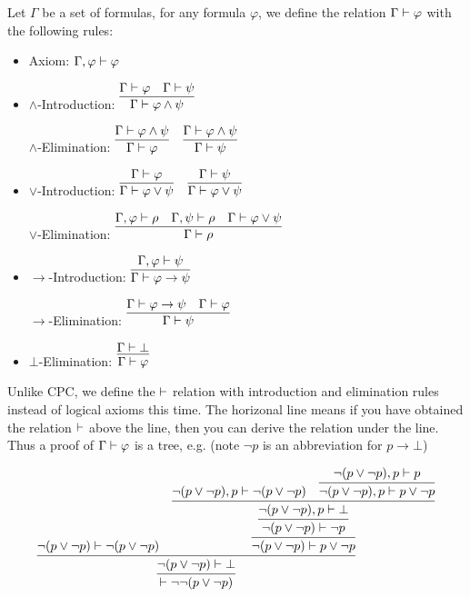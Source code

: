 \begin{definition}
    Let $\Gamma$ be a set of formulas, for any formula $\varphi$, we define
    the relation $\Gamma\vdash\varphi$ with the following rules:
    \begin{itemize}
        \item Axiom: $\Gamma,\varphi\vdash\varphi$
        \item $\wedge$-Introduction: $\infer{\Gamma\proves\varphi\wedge\psi}
            {\Gamma\proves\varphi & \Gamma\proves \psi}$

            $\wedge$-Elimination:
            $\infer{\Gamma\proves\varphi}{\Gamma\proves\varphi\wedge\psi}$\ \  
            $\infer{\Gamma\proves\psi}{\Gamma\proves\varphi\wedge\psi}$
        \item $\vee$-Introduction: 
            $\infer{\Gamma\proves\varphi\vee\psi}{\Gamma\proves\varphi}$\ \  
            $\infer{\Gamma\proves\varphi\vee\psi}{\Gamma\proves\psi}$

            $\vee$-Elimination:
            $\infer{\Gamma\proves\rho}
            {\Gamma,\varphi\proves\rho & \Gamma,\psi\proves\rho & \Gamma\proves\varphi\vee\psi}$

        \item $\to$-Introduction: 
            $\infer{\Gamma\proves\varphi\to\psi}{\Gamma,\varphi\proves\psi}$

            $\to$-Elimination:
            $\infer{\Gamma\proves\psi}{\Gamma\proves\varphi\to\psi & \Gamma\proves\varphi}$
        \item $\bot$-Elimination:
            $\infer{\Gamma\proves\varphi}{\Gamma\proves\bot}$
    \end{itemize}
\end{definition}

Unlike CPC, we define the $\vdash$
relation with introduction and elimination rules instead of logical axioms
this time. The horizonal line means if you have obtained the relation 
$\vdash$ above the line, then you can derive the relation under the line. 
Thus a proof of $\Gamma\vdash\varphi$ is a tree, e.g. (note $\neg p$ is an
abbreviation for $p\to\bot$)

\begin{equation}
    \label{nnLEM}
    $$
    \infer{\proves\neg\neg(p\vee\neg p)}{
        \infer{\neg(p\vee\neg p)\proves\bot}{
            \neg(p\vee\neg p)\proves \neg(p\vee\neg p)
            &
            \infer{\neg(p\vee\neg p)\proves p\vee\neg p}{
                \infer{\neg(p\vee\neg p)\proves\neg p}{
                    \infer{\neg(p\vee\neg p),p\proves\bot} {
                        \neg(p\vee \neg p), p\proves\neg(p\vee\neg p)
                        &
                        \infer{\neg(p\vee\neg p), p\proves p\vee\neg p}{
                            \neg(p\vee\neg p),p\proves p
                        }
                    }
                }
            }
        }
    }
    $$
\end{equation}


